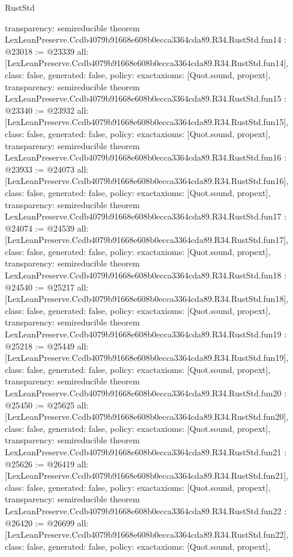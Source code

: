 \begin{lexlean}{RustStd}
\begin{coremodule}
{  transparency: semireducible
}
theorem LexLeanPreserve.Ccdb4079b91668e608b0ecca3364cda89.R34.RustStd.fun14 : @23018 := @23339 {
  all: [LexLeanPreserve.Ccdb4079b91668e608b0ecca3364cda89.R34.RustStd.fun14],
  class: false,
  generated: false,
  policy: exact{axioms: [Quot.sound, propext]},
  transparency: semireducible
}
theorem LexLeanPreserve.Ccdb4079b91668e608b0ecca3364cda89.R34.RustStd.fun15 : @23340 := @23932 {
  all: [LexLeanPreserve.Ccdb4079b91668e608b0ecca3364cda89.R34.RustStd.fun15],
  class: false,
  generated: false,
  policy: exact{axioms: [Quot.sound, propext]},
  transparency: semireducible
}
theorem LexLeanPreserve.Ccdb4079b91668e608b0ecca3364cda89.R34.RustStd.fun16 : @23933 := @24073 {
  all: [LexLeanPreserve.Ccdb4079b91668e608b0ecca3364cda89.R34.RustStd.fun16],
  class: false,
  generated: false,
  policy: exact{axioms: [Quot.sound, propext]},
  transparency: semireducible
}
theorem LexLeanPreserve.Ccdb4079b91668e608b0ecca3364cda89.R34.RustStd.fun17 : @24074 := @24539 {
  all: [LexLeanPreserve.Ccdb4079b91668e608b0ecca3364cda89.R34.RustStd.fun17],
  class: false,
  generated: false,
  policy: exact{axioms: [Quot.sound, propext]},
  transparency: semireducible
}
theorem LexLeanPreserve.Ccdb4079b91668e608b0ecca3364cda89.R34.RustStd.fun18 : @24540 := @25217 {
  all: [LexLeanPreserve.Ccdb4079b91668e608b0ecca3364cda89.R34.RustStd.fun18],
  class: false,
  generated: false,
  policy: exact{axioms: [Quot.sound, propext]},
  transparency: semireducible
}
theorem LexLeanPreserve.Ccdb4079b91668e608b0ecca3364cda89.R34.RustStd.fun19 : @25218 := @25449 {
  all: [LexLeanPreserve.Ccdb4079b91668e608b0ecca3364cda89.R34.RustStd.fun19],
  class: false,
  generated: false,
  policy: exact{axioms: [Quot.sound, propext]},
  transparency: semireducible
}
theorem LexLeanPreserve.Ccdb4079b91668e608b0ecca3364cda89.R34.RustStd.fun20 : @25450 := @25625 {
  all: [LexLeanPreserve.Ccdb4079b91668e608b0ecca3364cda89.R34.RustStd.fun20],
  class: false,
  generated: false,
  policy: exact{axioms: [Quot.sound, propext]},
  transparency: semireducible
}
theorem LexLeanPreserve.Ccdb4079b91668e608b0ecca3364cda89.R34.RustStd.fun21 : @25626 := @26419 {
  all: [LexLeanPreserve.Ccdb4079b91668e608b0ecca3364cda89.R34.RustStd.fun21],
  class: false,
  generated: false,
  policy: exact{axioms: [Quot.sound, propext]},
  transparency: semireducible
}
theorem LexLeanPreserve.Ccdb4079b91668e608b0ecca3364cda89.R34.RustStd.fun22 : @26420 := @26699 {
  all: [LexLeanPreserve.Ccdb4079b91668e608b0ecca3364cda89.R34.RustStd.fun22],
  class: false,
  generated: false,
  policy: exact{axioms: [Quot.sound, propext]},
}
\end{coremodule}
\end{lexlean}

